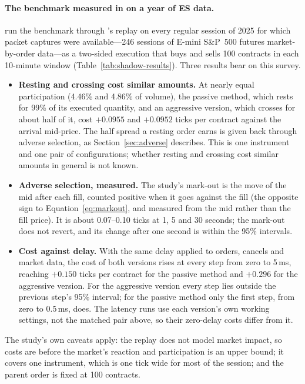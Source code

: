 \paragraph{The benchmark measured in \kasparhft{} on a year of ES data.} \citet{maciejewski_shadow} run the benchmark
through \kasparhft{}'s replay on every regular session of 2025 for which packet captures were available---246 sessions of
E-mini S\&P~500 futures market-by-order data---as a two-sided execution that buys and sells 100 contracts in each
10-minute window (Table~\ref{tab:shadow-results}). Three results bear on this survey.
\begin{itemize}[leftmargin=1.5em,itemsep=1pt]
\item \textbf{Resting and crossing cost similar amounts.} At nearly equal participation (4.46\% and 4.86\% of volume), the
  passive method, which rests for 99\% of its executed quantity, and an aggressive version, which crosses for about
  half of it, cost $+0.0955$ and $+0.0952$ ticks per contract against the arrival mid-price. The half spread a resting
  order earns is given back through adverse selection, as Section~\ref{sec:adverse} describes. This is one
  instrument and one pair of configurations; whether resting and crossing cost similar amounts in general is not known.
\item \textbf{Adverse selection, measured.} The study's mark-out is the move of the mid after each fill, counted
  positive when it goes against the fill (the opposite sign to Equation~\eqref{eq:markout}, and measured from the mid
  rather than the fill price). It is about
  0.07--0.10 ticks at 1, 5 and 30 seconds; the mark-out does not revert, and its change after one
  second is within the 95\% intervals.
\item \textbf{Cost against delay.} With the same delay applied to orders, cancels and market data, the cost of
  both versions rises at every step from zero to 5\,ms, reaching $+0.150$ ticks per contract for the passive method
  and $+0.296$ for the aggressive version. For the aggressive version every step lies outside the previous step's
  95\% interval; for the passive method only the first step, from zero to 0.5\,ms, does. The latency runs use each
  version's own working settings, not the matched pair above, so their zero-delay costs differ from it.
\end{itemize}
The study's own caveats apply: the replay does not model market impact, so costs are before the market's reaction
and participation is an upper bound; it covers one instrument, which is one tick wide for most of the session; and
the parent order is fixed at 100 contracts.


